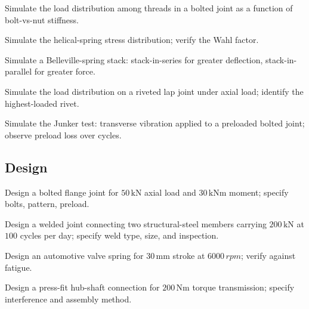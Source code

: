 \begin{exercise}
Simulate the load distribution among threads in a bolted joint as a function of bolt-vs-nut stiffness.
\end{exercise}

\begin{exercise}
Simulate the helical-spring stress distribution; verify the Wahl factor.
\end{exercise}

\begin{exercise}
Simulate a Belleville-spring stack: stack-in-series for greater deflection, stack-in-parallel for greater force.
\end{exercise}

\begin{exercise}
Simulate the load distribution on a riveted lap joint under axial load; identify the highest-loaded rivet.
\end{exercise}

\begin{exercise}
Simulate the Junker test: transverse vibration applied to a preloaded bolted joint; observe preload loss over cycles.
\end{exercise}

\subsection*{Design}

\begin{exercise}
Design a bolted flange joint for $50\,\si{\kilo\newton}$ axial load and $30\,\si{\kilo\newton\meter}$ moment; specify bolts, pattern, preload.
\end{exercise}

\begin{exercise}
Design a welded joint connecting two structural-steel members carrying $200\,\si{\kilo\newton}$ at $100$ cycles per day; specify weld type, size, and inspection.
\end{exercise}

\begin{exercise}
Design an automotive valve spring for $30\,\si{\milli\meter}$ stroke at $6000\,\si{rpm}$; verify against fatigue.
\end{exercise}

\begin{exercise}
Design a press-fit hub-shaft connection for $200\,\si{\newton\meter}$ torque transmission; specify interference and assembly method.
\end{exercise}

